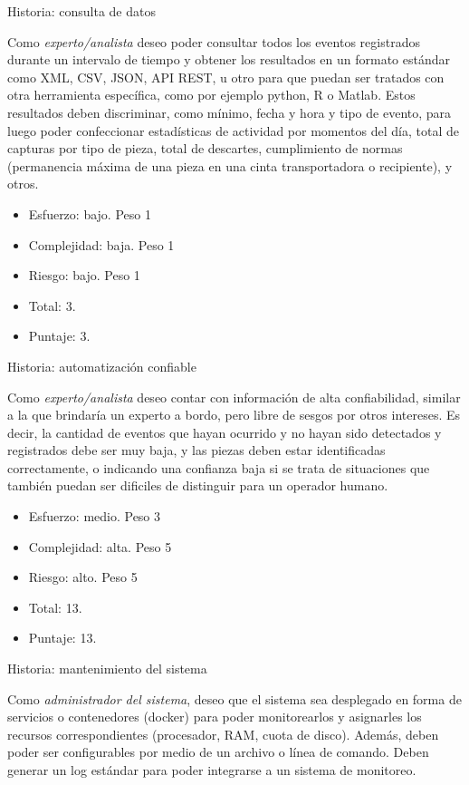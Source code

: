 \documentclass[11pt]{charter}
\begin{document}
Historia: consulta de datos

Como {\em experto/analista } deseo poder consultar todos los eventos registrados durante un intervalo de tiempo y obtener los resultados en un formato estándar como XML, CSV, JSON, API REST, u otro para que puedan ser tratados con otra herramienta específica, como por ejemplo python, R o Matlab. 
Estos resultados deben discriminar, como mínimo, fecha y hora y tipo de evento, para luego poder confeccionar estadísticas de actividad por momentos del día, total de capturas por tipo de pieza, total de descartes, cumplimiento de normas (permanencia máxima de una pieza en una cinta transportadora o recipiente), y otros.
\begin{itemize}
	\item Esfuerzo: bajo. Peso 1
	\item Complejidad: baja. Peso 1
	\item Riesgo: bajo. Peso 1
	\item Total: 3.
	\item Puntaje: 3.
\end{itemize}
	
Historia: automatización confiable
	
Como {\em experto/analista} deseo contar con información de alta confiabilidad, similar a la que brindaría un experto a bordo, pero libre de sesgos por otros intereses. Es decir, la cantidad de eventos que hayan ocurrido y no hayan sido detectados y registrados debe ser muy baja, y las piezas deben estar identificadas correctamente, o indicando una confianza baja si se trata de situaciones que también puedan ser dificiles de distinguir para un operador humano.
\begin{itemize}
	\item Esfuerzo: medio. Peso 3
	\item Complejidad: alta. Peso 5
	\item Riesgo: alto. Peso 5
	\item Total: 13.
	\item Puntaje: 13.
\end{itemize}

Historia: mantenimiento del sistema

Como {\em administrador del sistema}, deseo que el sistema sea desplegado en forma de servicios o contenedores (docker) para poder monitorearlos y asignarles los recursos correspondientes (procesador, RAM, cuota de disco). Además, deben poder ser configurables por medio de un archivo o línea de comando. Deben generar un log estándar para poder integrarse a un sistema de monitoreo.
	
\end{document}

